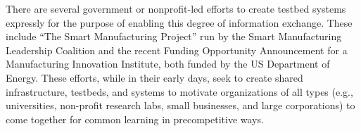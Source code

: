 There are several government or nonprofit-led efforts to create testbed systems expressly for the purpose of enabling this degree of information exchange. These include ``The Smart Manufacturing Project'' run by the Smart Manufacturing Leadership Coalition and the recent Funding Opportunity Announcement for a Manufacturing Innovation Institute, both funded by the US Department of Energy\cite{SmartManufacturingLeadershipCoalition2013,EERE-MII}. These efforts, while in their early days, seek to create shared infrastructure, testbeds, and systems to motivate organizations of all types (e.g., universities, non-profit research labs, small businesses, and large corporations) to come together for common learning in precompetitive ways. 
